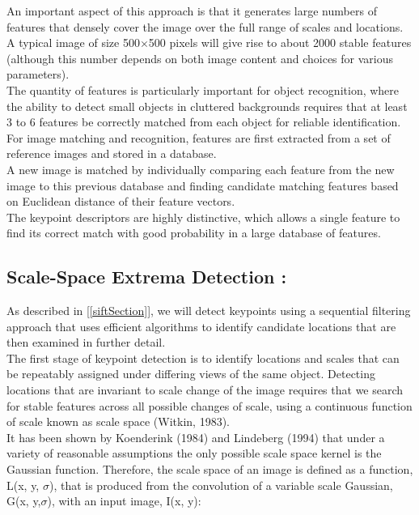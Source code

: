 An important aspect of this approach is that it generates large numbers of features that
densely cover the image over the full range of scales and locations.\\ A typical image of size
500$\times$500 pixels will give rise to about 2000 stable features (although this number depends
on both image content and choices for various parameters).\\ The quantity of features is
particularly important for object recognition, where the ability to detect small objects in
cluttered backgrounds requires that at least 3 to 6 features be correctly matched from each
object for reliable identification.
For image matching and recognition, features are first extracted from a set of reference
images and stored in a database.\\ A new image is matched by individually comparing
each feature from the new image to this previous database and finding candidate matching
features based on Euclidean distance of their feature vectors.\\
The keypoint descriptors are highly distinctive, which allows a single feature to find its
correct match with good probability in a large database of features. 



\subsection{Scale-Space Extrema Detection :}
As described in [\ref{siftSection}], we will detect keypoints using a sequential filtering approach
that uses efficient algorithms to identify candidate locations that are then examined
in further detail.\\ The first stage of keypoint detection is to identify locations and scales that
can be repeatably assigned under differing views of the same object. Detecting locations
that are invariant to scale change of the image requires that we search for stable features
across all possible changes of scale, using a continuous function of scale known as scale
space (Witkin, 1983).\\
It has been shown by Koenderink (1984) and Lindeberg (1994) that under a variety of reasonable assumptions the only possible scale space kernel is the Gaussian function.
Therefore, the scale space of an image is defined as a function, L(x, y, $\sigma$), that is produced
from the convolution of a variable scale Gaussian, G(x, y,$\sigma$), with an input image, I(x, y):\\

